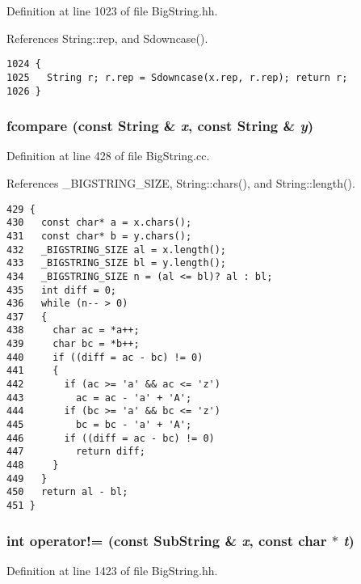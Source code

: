 Definition at line 1023 of file Big\-String.hh.

References String::rep, and Sdowncase().



\footnotesize\begin{verbatim}1024 {
1025   String r; r.rep = Sdowncase(x.rep, r.rep); return r;
1026 }
\end{verbatim}\normalsize 
{}
\subsubsection{ fcompare (const {\bf String} \& {\em x}, const {\bf String} \& {\em y})}\label{BigString_8hh_a33}




Definition at line 428 of file Big\-String.cc.

References \_\-BIGSTRING\_\-SIZE, String::chars(), and String::length().



\footnotesize\begin{verbatim}429 {
430   const char* a = x.chars();
431   const char* b = y.chars();
432   _BIGSTRING_SIZE al = x.length();
433   _BIGSTRING_SIZE bl = y.length();
434   _BIGSTRING_SIZE n = (al <= bl)? al : bl;
435   int diff = 0;
436   while (n-- > 0)
437   {
438     char ac = *a++;
439     char bc = *b++;
440     if ((diff = ac - bc) != 0)
441     {
442       if (ac >= 'a' && ac <= 'z')
443         ac = ac - 'a' + 'A';
444       if (bc >= 'a' && bc <= 'z')
445         bc = bc - 'a' + 'A';
446       if ((diff = ac - bc) != 0)
447         return diff;
448     }
449   }
450   return al - bl;
451 }
\end{verbatim}\normalsize 
{}
\subsubsection{\setlength{\rightskip}{0pt plus 5cm}int operator!= (const {\bf Sub\-String} \& {\em x}, const char $\ast$ {\em t})\hspace{0.3cm}{\tt  [inline]}}\label{BigString_8hh_a117}




Definition at line 1423 of file Big\-String.hh.

